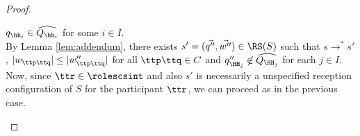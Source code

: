 \begin{proof}
\begin{description}
$q_{\hh_i}\in\widehat{Q_{\hh_i}}$ for some $i\in I$.\\
 By Lemma \ref{lem:addendum}, there exists $s'= (\vec{q''},\vec{w''})\in \RS(S)$ 
 such that $s \to^* s'$,
 $|w_{\ttp\ttq}| \leq |w''_{\ttp\ttq}|$ for all $\ttp\ttq \in C$ and
$q''_{\HH_j}\not\in\widehat{Q_{\HH_j}}$ for each $j\in I$. 
Now, since $\ttr\in\rolescsint$ and also $s'$ is necessarily a unspecified reception configuration of $S$ for the participant $\ttr$, we can proceed as in the previous case.
\end{description}
\end{proof}


%
